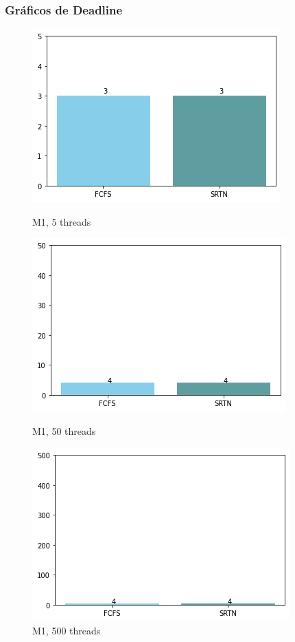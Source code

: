 \documentclass{beamer}
\begin{document}
\begin{frame}
\frametitle{Gráficos de Deadline}

\blindtext

\begin{figure}[!htb]
  \includegraphics[width=\linewidth]{imgs/deadline5-1}
  \caption{M1, 5 threads}\label{fig:awesome_image1}
\endminipage\hfill
{}
  \includegraphics[width=\linewidth]{imgs/deadline50-1}
  \caption{M1, 50 threads}\label{fig:awesome_image2}
\endminipage\hfill
{}%
  \includegraphics[width=\linewidth]{imgs/deadline500-1}
  \caption{M1, 500 threads}\label{fig:awesome_image3}
\endminipage
\end{figure}


\end{frame}
\end{document}
